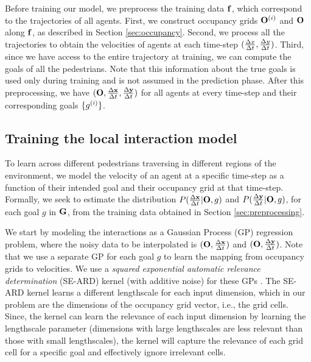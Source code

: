 %
%
%
%
%
%
%
%
%
%

%
%
%
%
%
%
Before training our model, we preprocess the training data $\mathbf{f}$,
which correspond to the trajectories of all agents. First, we
construct occupancy grids $\mathbf{O}^{(i)}$ and $\mathbf{O}$ along $\mathbf{f}$, as described in
Section \ref{sec:occupancy}. Second, we process all the trajectories
to obtain the velocities of agents at each time-step $(\frac{\Delta x}{\Delta t},
\frac{\Delta y}{\Delta t})$. Third, since we have access to the entire trajectory at
training, we can compute the goals of all the pedestrians.  Note that
this information about the true goals is used only during training and
is not assumed in the prediction phase.  After this preprocessing, we
have $(\mathbf{O}, \frac{\Delta \mathbf{x}}{\Delta t}, \frac{\Delta \mathbf{y}}{\Delta t})$ for all agents at every time-step and
their corresponding goals $\{g^{(i)}\}$.%

\subsection{Training the local interaction model}
\label{sec:train}

To learn across different pedestrians traversing in different regions
of the environment, we model the velocity of an agent at a specific
time-step as a function of their intended goal and their occupancy
grid at that time-step. Formally, we seek to estimate the distribution
$P(\frac{\Delta \mathbf{x}}{\Delta t}| \mathbf{O}, g)$ and $P(\frac{\Delta \mathbf{y}}{\Delta t}| \mathbf{O}, g)$, for each goal $g$
in $\mathbf{G}$, from the training data obtained in Section
\ref{sec:preprocessing}.

We start by modeling the interactions as a Gaussian Process (GP)
regression problem, where the noisy data to be interpolated is
$(\mathbf{O}, \frac{\Delta \mathbf{x}}{\Delta t})$ and $(\mathbf{O}, \frac{\Delta \mathbf{y}}{\Delta t})$. Note that we use a separate
GP for each goal $g$ to learn the mapping from occupancy grids to
velocities. We use a \textit{squared exponential automatic relevance
  determination} (SE-ARD) kernel (with additive noise) for these GPs
\cite{rasmussen06}.  The SE-ARD kernel learns a different lengthscale
for each input dimension, which in our problem are the dimensions of
the occupancy grid vector, i.e., the grid cells. Since, the kernel can
learn the relevance of each input dimension by learning the
lengthscale parameter \cite{rasmussen06} (dimensions with large
lengthscales are less relevant than those with small lengthscales), the
kernel will capture the relevance of each grid cell for a specific
goal and effectively ignore irrelevant cells.
%
%
%
%
%
%
%
%
%
%
%
%


